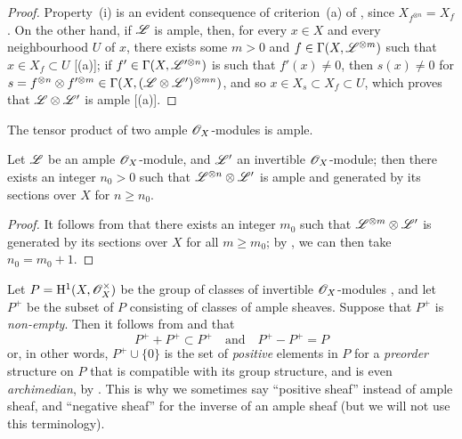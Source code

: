 \begin{proof}
  Property~(i) is an evident consequence of criterion~(a) of , since $X_{f^{\otimes n}}=X_f$.
  On the other hand, if $\mathscr{L}$ is ample, then, for every $x\in X$ and every neighbourhood $U$ of $x$, there exists some $m>0$ and $f\in\Gamma(X,\mathscr{L}^{\otimes m})$ such that $x\in X_f\subset U$ [(a)];
  if $f'\in\Gamma(X,\mathscr{L}'^{\otimes n})$ is such that $f'(x)\neq0$, then $s(x)\neq0$ for $s=f^{\otimes n}\otimes f'^{\otimes m}\in\Gamma(X,(\mathscr{L}\otimes\mathscr{L}')^{\otimes mn})$, and so $x\in X_s\subset X_f\subset U$, which proves that $\mathscr{L}\otimes\mathscr{L}'$ is ample [(a)].
\end{proof}

\begin{corollary}[4.5.7]
\label{II.4.5.7}
The tensor product of two ample $\mathscr{O}_X$-modules is ample.
\end{corollary}

\begin{corollary}[4.5.8]
\label{II.4.5.8}
Let $\mathscr{L}$ be an ample $\mathscr{O}_X$-module, and $\mathscr{L}'$ an invertible $\mathscr{O}_X$-module;
then there exists an integer $n_0>0$ such that $\mathscr{L}^{\otimes n}\otimes\mathscr{L}'$ is ample and generated by its sections over $X$ for $n\geq n_0$.
\end{corollary}

\begin{proof}
It follows from  that there exists an integer $m_0$ such that $\mathscr{L}^{\otimes m}\otimes\mathscr{L}'$ is generated by its sections over $X$ for all $m\geq m_0$;
by , we can then take $n_0=m_0+1$.
\end{proof}

\begin{remark}[4.5.9]
\label{II.4.5.9}
Let $P=\mathrm{H}^1(X,\mathscr{O}_X^\times)$ be the group of classes of invertible $\mathscr{O}_X$-modules , and let $P^+$ be the subset of $P$ consisting of classes of ample sheaves.
Suppose that $P^+$ is \emph{non-empty}.
Then it follows from  and  that
\[
  P^+ + P^+ \subset P^+
  \quad\text{and}\quad
  P^+ - P^+ = P
\]
or, in other words, $P^+\cup\{0\}$ is the set of \emph{positive} elements in $P$ for a \emph{preorder} structure on $P$ that is compatible with its group structure, and is even \emph{archimedian}, by .
This is why we sometimes say ``positive sheaf'' instead of ample sheaf, and ``negative sheaf'' for the inverse of an ample sheaf (but we will not use this terminology).
\end{remark}

